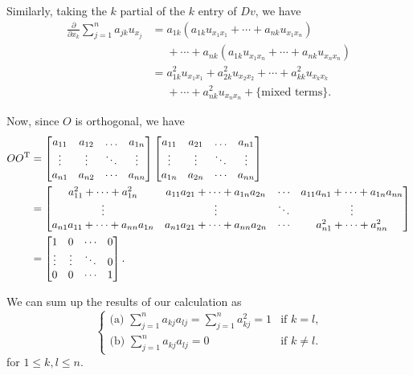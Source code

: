 \begin{solution*}
  Similarly, taking the \(k\) partial of the \(k\)
  entry of \(Dv\), we have
  \begin{equation}
    \label{eq:5:laplacian-k-part}
    \begin{aligned}
      \tfrac{\partial}{\partial x_k}\sum_{j=1}^n a_{jk}u_{x_j}
      &=a_{1k}(a_{1k}u_{x_1x_1}+\dotsb+a_{nk}u_{x_1x_n})\\
      &\phantom{{}={}}+\dotsb+a_{nk}
      (a_{1k}u_{x_1x_n}+\dotsb+a_{nk}u_{x_nx_n})\\
      &=a_{1k}^2u_{x_1x_1}+a_{2k}^2u_{x_2x_2}+\dotsb+a_{kk}^2u_{x_kx_k}\\
      &\phantom{{}={}}+\dotsb+a_{nk}^2u_{x_nx_n}+\{\text{mixed terms}\}.
    \end{aligned}
  \end{equation}

  Now, since \(O\) is orthogonal, we have
  \begin{align*}
    OO^\rmT
    &=%
    \begin{bmatrix}
      a_{11}&a_{12}&\dotsc&a_{1n}\\
      \vdots&\vdots&\ddots&\vdots\\
      a_{n1}&a_{n2}&\cdots&a_{nn}
    \end{bmatrix}
    \begin{bmatrix}
      a_{11}&a_{21}&\dotsc&a_{n1}\\
      \vdots&\vdots&\ddots&\vdots\\
      a_{1n}&a_{2n}&\cdots&a_{nn}
    \end{bmatrix}
    \\
    &=%
      \begin{bmatrix}
        a_{11}^2+\dotsb+a_{1n}^2&a_{11}a_{21}+\dotsb+a_{1n}a_{2n}
        &\cdots&a_{11}a_{n1}+\dotsb+a_{1n}a_{nn}\\
        \vdots&\vdots&\ddots&\vdots\\
        a_{n1}a_{11}+\dotsb+a_{nn}a_{1n}&a_{n1}a_{21}+\dotsb+a_{nn}a_{2n}
        &\cdots&a_{n1}^2+\dotsb+a_{nn}^2
      \end{bmatrix}\\
    &=\begin{bmatrix}
      1&0&\cdots&0\\
      \vdots&\vdots&\ddots&0\\
      0&0&\cdots&1
      \end{bmatrix}.
  \end{align*}

  We can sum up the results of our calculation as
  \begin{equation}
    \label{eq:5:ortho-matrix}
    \begin{cases}
    \text{(a) }\sum_{j=1}^na_{kj}a_{lj}=\sum_{j=1}^na_{kj}^2=1&\text{if \(k=l\),}\\
    \text{(b) }\sum_{j=1}^na_{kj}a_{lj}=0&\text{if \(k\neq l\).}
    \end{cases}
  \end{equation}
  for \(1\leq k,l\leq n\).


\end{solution*}
